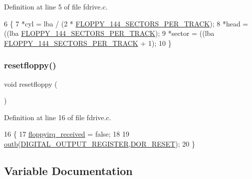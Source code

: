 Definition at line 5 of file fdrive.\+c.


\begin{DoxyCode}
6 \{
7     *cyl    = lba / (2 * \hyperlink{a00017_a04d40064bde801f12fb73134cf328150_a04d40064bde801f12fb73134cf328150}{FLOPPY\_144\_SECTORS\_PER\_TRACK});
8     *head   = ((lba %
      \hyperlink{a00017_a04d40064bde801f12fb73134cf328150_a04d40064bde801f12fb73134cf328150}{FLOPPY\_144\_SECTORS\_PER\_TRACK});
9     *sector = ((lba %
      \hyperlink{a00017_a04d40064bde801f12fb73134cf328150_a04d40064bde801f12fb73134cf328150}{FLOPPY\_144\_SECTORS\_PER\_TRACK} + 1);
10 \}
\end{DoxyCode}
\mbox{\label{a00017_ad64d38a767bc5f30a3e13a5b01b9cf35_ad64d38a767bc5f30a3e13a5b01b9cf35}} 
\subsubsection{\texorpdfstring{resetfloppy()}{resetfloppy()}}
{\footnotesize\ttfamily void resetfloppy (\begin{DoxyParamCaption}{ }\end{DoxyParamCaption})}



Definition at line 16 of file fdrive.\+c.


\begin{DoxyCode}
16                    \{
17     \hyperlink{a00017_a2cfa75d25a7da8cb54551c7840e80d40_a2cfa75d25a7da8cb54551c7840e80d40}{floppyirq\_received} = \textcolor{keyword}{false};
18 
19     \hyperlink{a00110_aa37f5841c54156a4b14fc0d6f626b44f_aa37f5841c54156a4b14fc0d6f626b44f}{outb}(\hyperlink{a00017_a203a664e6f1b58c27efb4db8ff9db144_a203a664e6f1b58c27efb4db8ff9db144a9767b7f5f447d5346411d03077fea82a}{DIGITAL\_OUTPUT\_REGISTER},\hyperlink{a00017_a6ef9f5776b2d959e47c6c42111900071_a6ef9f5776b2d959e47c6c42111900071}{DOR\_RESET});
20 \}
\end{DoxyCode}


\subsection{Variable Documentation}
\mbox{\label{a00017_a2cfa75d25a7da8cb54551c7840e80d40_a2cfa75d25a7da8cb54551c7840e80d40}} 
